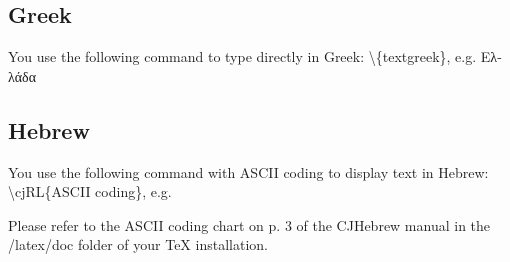 \documentclass[12pt]{MUNThesisBibTeX}
\begin{document}

\subsection{Greek}
You use the following command to type directly in Greek: \textbackslash\{textgreek\}, e.g. \textgreek{Ελλάδα}

\subsection{Hebrew}
You use the following command with ASCII coding to display text in Hebrew:  \textbackslash cjRL\{ASCII coding\}, e.g. %

Please refer to the ASCII coding chart on p. 3 of the CJHebrew manual in the /latex/doc folder of your TeX installation.

\cleardoublepage




 
\end{document}
